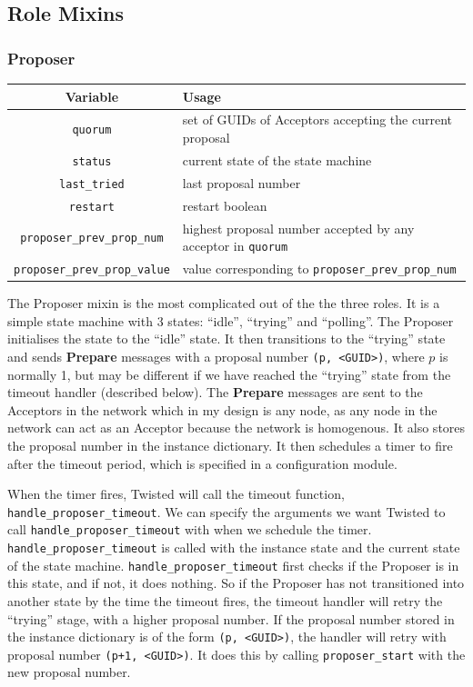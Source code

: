 \documentclass[12pt,twoside,notitlepage]{report}
\newcommand{\msg}[1] {{\bf #1}}         %
\begin{document}
\subsection{Role Mixins}

\subsubsection{Proposer}


\begin{tabular}{ | c | p{7cm} | }
  \hline
  {\bf Variable} & {\bf Usage} \\ \hline
  \verb+quorum+ & set of GUIDs of Acceptors accepting the current proposal \\ \hline
  \verb+status+ & current state of the state machine \\ \hline
  \verb+last_tried+ & last proposal number \\ \hline
  \verb+restart+ & restart boolean \\ \hline
  \verb+proposer_prev_prop_num+ & highest proposal number accepted by any acceptor in \verb+quorum+ \\ \hline
  \verb+proposer_prev_prop_value+  & value corresponding to \verb+proposer_prev_prop_num+ \\ \hline
\end{tabular}


The Proposer mixin is the most complicated out of the the three roles. It is a simple state
machine with 3 states: ``idle'', ``trying'' and ``polling''. The Proposer initialises the state to
the ``idle'' state. It then transitions to the ``trying'' state and sends \msg{Prepare} messages
with a proposal number \verb+(p, <GUID>)+, where $p$ is normally 1, but may be different if we
have reached the ``trying'' state from the timeout handler (described below). The \msg{Prepare}
messages are sent to the Acceptors in the network which in my design is any node, as any node in
the network can act as an Acceptor because the network is homogenous. It also stores the proposal
number in the instance dictionary. It then schedules a timer to fire after the timeout period,
which is specified in a configuration module.

When the timer fires, Twisted will call the timeout function, \verb+handle_proposer_timeout+. We
can specify the arguments we want Twisted to call \verb+handle_proposer_timeout+ with when we
schedule the timer. \verb+handle_proposer_timeout+ is called with the instance state and the
current state of the state machine. \verb+handle_proposer_timeout+ first checks if the Proposer is
in this state, and if not, it does nothing. So if the Proposer has not transitioned into another
state by the time the timeout fires, the timeout handler will retry the ``trying'' stage, with a
higher proposal number. If the proposal number stored in the instance dictionary is of the form
\verb+(p, <GUID>)+, the handler will retry with proposal number \verb$(p+1, <GUID>)$. It does this
by calling \verb+proposer_start+ with the new proposal number.
\end{document}
